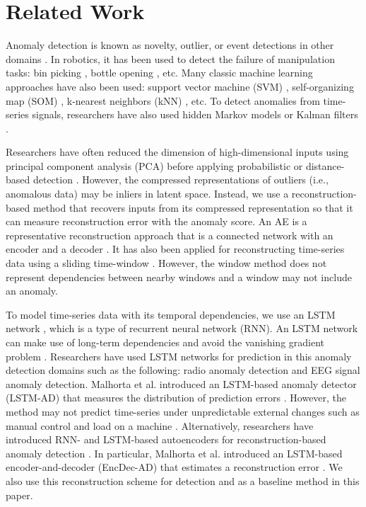 \documentclass[letterpaper, 10 pt, conference]{ieeeconf}
\begin{document}
\section{Related Work}
Anomaly detection is known as novelty, outlier, or event detections in other domains \cite{Chandola2009}. In robotics, it has been used to detect the failure of manipulation tasks: bin picking \cite{Rodriguez_2011_6893}, bottle opening \cite{Kappler-RSS-15}, etc. Many classic machine learning approaches have also been used: support vector machine (SVM) \cite{rodriguez2010failure, Hornung2014}, self-organizing map (SOM) \cite{haussermann2014novel}, k-nearest neighbors (kNN) \cite{ando2011ace}, etc. To detect anomalies from time-series signals, researchers have also used hidden Markov models \cite{park2016multimodal} or Kalman filters \cite{furukawa2015estimating}.

Researchers have often reduced the dimension of high-dimensional inputs using principal component analysis (PCA) before applying probabilistic or distance-based detection \cite{rodriguez2010failure, sukhoy2012learning}. However, the compressed representations of outliers (i.e., anomalous data) may be inliers in latent space. Instead, we use a reconstruction-based method that recovers inputs from its compressed representation so that it can measure reconstruction error with the anomaly score. An AE is a representative reconstruction approach that is a connected network with an encoder and a decoder \cite{hinton2006reducing}. It has also been applied for reconstructing time-series data using a sliding time-window \cite{noda2014multimodal}. However, the window method does not represent dependencies between nearby windows and a window may not include an anomaly.

  To model time-series data with its temporal dependencies, we use an LSTM network \cite{hochreiter1997long}, which is a type of recurrent neural network (RNN). An LSTM network can make use of long-term dependencies and avoid the vanishing gradient problem \cite{hochreiter1997long}. Researchers have used LSTM networks for prediction in this anomaly detection domains such as the following: radio anomaly detection \cite{o2016recurrent} and EEG signal anomaly detection\cite{chauhan2015anomaly}. Malhorta et al. introduced an LSTM-based anomaly detector (LSTM-AD) that measures the distribution of prediction errors \cite{malhotra2015long}. However, the method may not predict time-series under unpredictable external changes such as manual control and load on a machine \cite{malhotra2016lstm}. Alternatively, researchers have introduced RNN- and LSTM-based autoencoders for reconstruction-based anomaly detection \cite{cho2014learning, principi2017acoustic}. In particular, Malhorta et al. introduced an LSTM-based encoder-and-decoder (EncDec-AD) that estimates a reconstruction error \cite{malhotra2016lstm}. We also use this reconstruction scheme for detection and as a baseline method in this paper.
\end{document}
